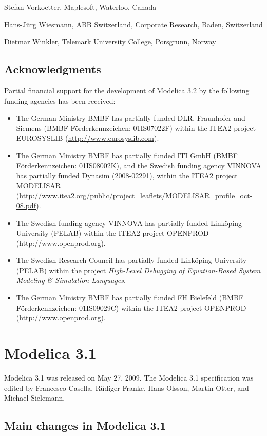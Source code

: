Stefan Vorkoetter, Maplesoft, Waterloo, Canada

Hans-Jürg Wiesmann, ABB Switzerland, Corporate Research, Baden,
Switzerland

Dietmar Winkler, Telemark University College, Porsgrunn, Norway

\subsection{Acknowledgments}

Partial financial support for the development of Modelica 3.2 by the
following funding agencies has been received:

\begin{itemize}
\item
  The German Ministry BMBF has partially funded DLR, Fraunhofer and
  Siemens (BMBF Förderkennzeichen: 01IS07022F) within the ITEA2 project
  EUROSYSLIB (\url{http://www.eurosyslib.com}).
\item
  The German Ministry BMBF has partially funded ITI GmbH (BMBF
  Förderkennzeichen: 01IS08002K), and the Swedish funding agency VINNOVA
  has partially funded Dynasim (2008-02291), within the ITEA2 project
  MODELISAR
  (\url{http://www.itea2.org/public/project_leaflets/MODELISAR_profile_oct-08.pdf}).
\item
  The Swedish funding agency VINNOVA has partially funded Linköping
  University (PELAB) within the ITEA2 project OPENPROD
  (http://www.openprod.org).
\item
  The Swedish Research Council has partially funded Linköping University
  (PELAB) within the project \emph{High-Level Debugging of Equation-Based
  System Modeling \& Simulation Languages}.
\item
  The German Ministry BMBF has partially funded FH Bielefeld (BMBF
  Förderkennzeichen: 01IS09029C) within the ITEA2 project OPENPROD
  (\href{http://www.openprod.}{http://www.openprod.org}).
\end{itemize}

\section{Modelica 3.1}

Modelica 3.1 was released on May 27, 2009. The Modelica 3.1
specification was edited by Francesco Casella, Rüdiger Franke, Hans
Olsson, Martin Otter, and Michael Sielemann.

\subsection{Main changes in Modelica 3.1}

